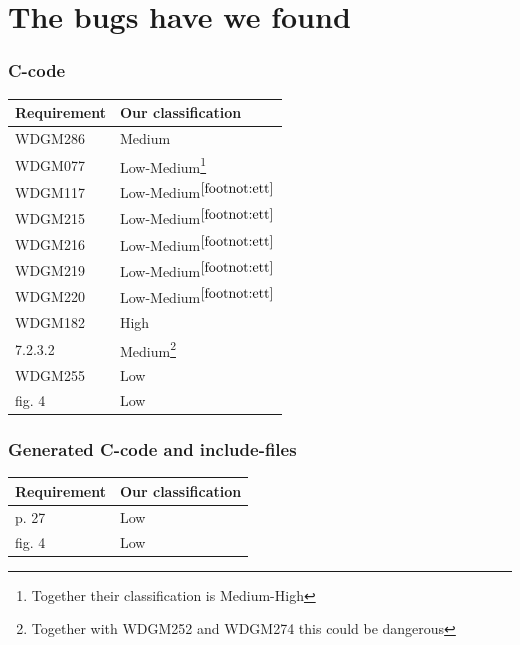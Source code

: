 \documentclass{beamer}
\begin{document}
\section{The bugs have we found}

\begin{frame}
  \frametitle{C-code}
  \begin{tabular}{l l}
    Requirement & Our classification\\\hline
    WDGM286 & Medium\\
    WDGM077 & Low-Medium\footnote{\label{footnot:ett} Together their classification is Medium-High}\\
    WDGM117 & Low-Medium$^{\ref{footnot:ett}}$ \\
    WDGM215 & Low-Medium$^{\ref{footnot:ett}}$ \\
    WDGM216 & Low-Medium$^{\ref{footnot:ett}}$ \\
    WDGM219 & Low-Medium$^{\ref{footnot:ett}}$ \\
    WDGM220 & Low-Medium$^{\ref{footnot:ett}}$ \\
    WDGM182 & High\\
    7.2.3.2 & Medium\footnote{\label{footnot:tva} Together with WDGM252 and WDGM274
      this could be dangerous}\\
    WDGM255 & Low\\
    fig. 4  & Low
  \end{tabular}
\end{frame}


\begin{frame}
  \frametitle{Generated C-code and include-files}
  \begin{tabular}{l l}
    Requirement & Our classification\\\hline
    p. 27       & Low\\
    fig. 4      & Low\\
  \end{tabular}
\end{frame}
\end{document}
